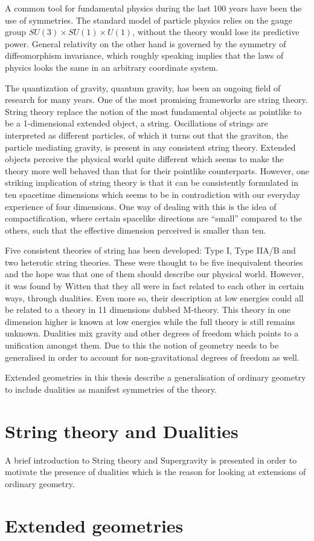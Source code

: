 A common tool for fundamental physics during the last 100 years have been the use of symmetries. The standard model of particle physics relies on the gauge group $SU(3)\times SU(1)\times U(1)$, without the theory would lose its predictive power. General relativity on the other hand is governed by the symmetry of diffeomorphism invariance, which roughly speaking implies that the laws of physics looks the same in an arbitrary coordinate system. 

The quantization of gravity, quantum gravity, has been an ongoing field of research for many years. One of the most promising frameworks are string theory. String theory replace the notion of the most fundamental objects as pointlike to be a 1-dimensional extended object, a string. Oscillations of strings are interpreted as different particles, of which it turns out that the graviton, the particle mediating gravity, is present in any consistent string theory. Extended objects perceive the physical world quite different which seems to make the theory more well behaved than that for their pointlike counterparts. However, one striking implication of string theory is that it can be consistently formulated in ten spacetime dimensions which seems to be in contradiction with our everyday experience of four dimensions. One way of dealing with this is the idea of compactification, where certain spacelike directions are ``small'' compared to the others, such that the effective dimension perceived is smaller than ten. 

Five consistent theories of string has been developed: Type I, Type IIA/B and two heterotic string theories. These were thought to be five inequivalent theories and the hope was that one of them should describe our physical world. However, it was found by Witten that they all were in fact related to each other in certain ways, through dualities. Even more so, their description at low energies could all be related to a theory in 11 dimensions dubbed M-theory. This theory in one dimension higher is known at low energies while the full theory is still remains unknown. Dualities mix gravity and other degrees of freedom which points to a unification amongst them. Due to this the notion of geometry needs to be generalised in order to account for non-gravitational degrees of freedom as well.

Extended geometries in this thesis describe a generalisation of ordinary geometry to include dualities as manifest symmetries of the theory. 


\section{String theory and Dualities}

A brief introduction to String theory and Supergravity is presented in order to motivate the presence of dualities which is the reason for looking at extensions of ordinary geometry.

\section{Extended geometries}


